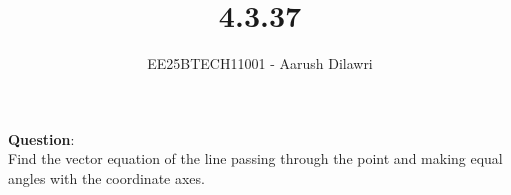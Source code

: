 \documentclass[journal]{IEEEtran}
\begin{document}

\vspace{3cm}

\title{4.3.37}
\author{EE25BTECH11001 - Aarush Dilawri}
\maketitle
{\let\newpage\relax\maketitle}

\renewcommand{\thefigure}{\theenumi}
\renewcommand{\thetable}{\theenumi}
\setlength{\intextsep}{10pt} %


\renewcommand{\thetable}{\theenumi}

\textbf{Question}:\\
Find the vector equation of the line passing through the point  and making equal angles with the coordinate axes.

\solution \\
\end{document}

